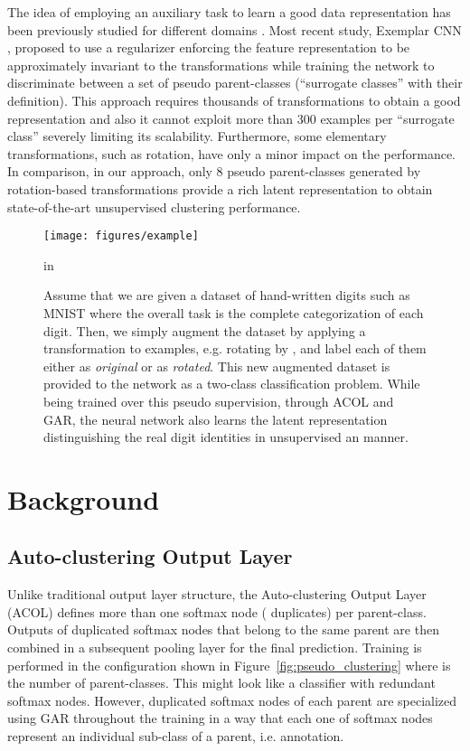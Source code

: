\documentclass{article} \usepackage{iclr2018_conference,times}
\begin{document}
The idea of employing an auxiliary task to learn a good data representation has been previously studied for different domains \citep{CollobertWBKKK11, AhmedYXGX08}. Most recent study, Exemplar CNN \citep{DosovitskiyFSRB16}, proposed to use a regularizer enforcing the feature representation to be approximately invariant to the transformations while training the network to discriminate between a set of pseudo parent-classes (``surrogate classes'' with their definition). This approach requires thousands of transformations to obtain a good representation and also it cannot exploit more than 300 examples per ``surrogate class'' severely limiting its scalability. Furthermore, some elementary transformations, such as rotation, have only a minor impact on the performance. In comparison, in our approach, only 8 pseudo parent-classes generated by rotation-based transformations provide a rich latent representation to obtain state-of-the-art unsupervised clustering performance. 

\begin{figure}[t]
	\begin{center}
		\centerline{\texttt{[image: figures/example]}}
		\caption{Assume that we are given a dataset of hand-written digits such as MNIST where the overall task is the complete categorization of each digit. Then, we simply augment the dataset by applying a transformation to examples, e.g. rotating by , and label each of them either as \textit{original} or as \textit{rotated}. This new augmented dataset is provided to the network as a two-class classification problem. While being trained over this pseudo supervision, through ACOL and GAR, the neural network also learns the latent representation distinguishing the real digit identities in unsupervised an manner.}
		\label{fig:pseudo_motivation}
	\end{center}
	 in
\end{figure}

\section{Background}
\subsection{Auto-clustering Output Layer}

Unlike traditional output layer structure, the Auto-clustering Output Layer (ACOL) \citep{KilincU17ACOL} defines more than one softmax node ( duplicates) per parent-class. Outputs of  duplicated softmax nodes that belong to the same parent are then combined in a subsequent pooling layer for the final prediction. Training is performed in the configuration shown in Figure~\ref{fig:pseudo_clustering} where  is the number of parent-classes. This might look like a classifier with redundant softmax nodes. However, duplicated softmax nodes of each parent are specialized using GAR throughout the training in a way that each one of  softmax nodes represent an individual sub-class of a parent, i.e. annotation.
\end{document}
